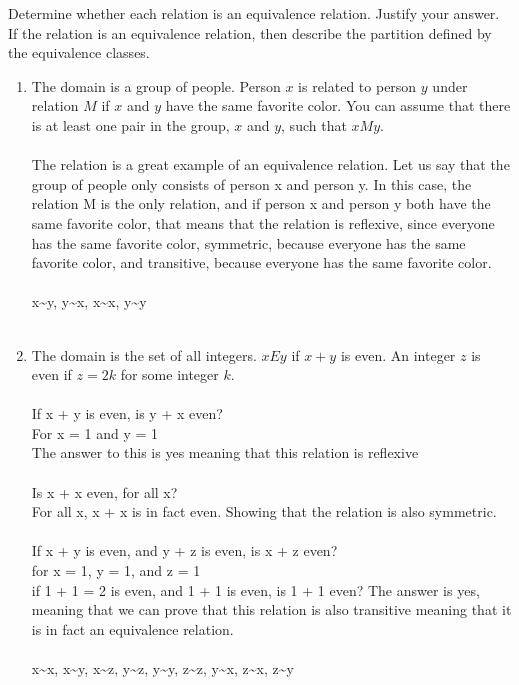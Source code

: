 Determine whether each relation is an equivalence relation. Justify your answer. If the relation is an equivalence relation, then describe the partition defined by the equivalence classes.\\
\begin{enumerate}[label=(\alph*)]
\item The domain is a group of people. Person $x$ is related to person $y$ under relation $M$ if $x$ and $y$ have the same favorite color. You can assume that there is at least one pair in the group, $x$ and $y$, such that $xMy$.\\\\
The relation is a great example of an equivalence relation. Let us say that the group of people only consists of person x and person y. In this case, the relation M is the only relation, and if person x and person y both have the same favorite color, that means that the relation is reflexive, since everyone has the same favorite color, symmetric, because everyone has the same favorite color, and transitive, because everyone has the same favorite color.\\
\\
x\sim y, y\sim x, x\sim x, y\sim y
\\\\

\item The domain is the set of all integers. $xEy$ if $x + y$ is even. An integer $z$ is even if $z = 2k$ for some integer $k$.\\\\
If x + y is even, is y + x even?\\
For x = 1 and y = 1\\
The answer to this is yes meaning that this relation is reflexive\\
\\
Is x + x even, for all x?\\
For all x, x + x is in fact even. Showing that the relation is also symmetric.\\
\\
If x + y is even, and y + z is even, is x + z even?\\
for x = 1, y = 1, and z = 1\\
if 1 + 1 = 2 is even, and 1 + 1 is even, is 1 + 1 even? The answer is yes, meaning that we can prove that this relation is also transitive meaning that it is in fact an equivalence relation.\\
\\
x\sim x, x\sim y, x\sim z, y\sim z, y\sim y, z\sim z, y\sim x, z\sim x, z\sim y 
\\\\

\end{enumerate}




